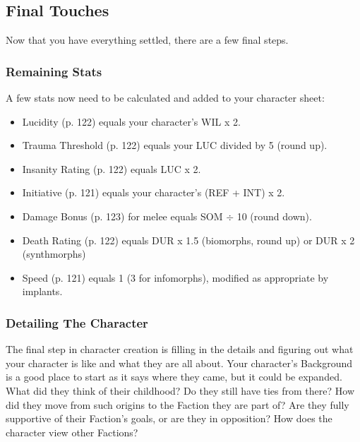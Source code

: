 \subsection{Final Touches}

Now that you have everything settled, there are a few final steps.

\subsubsection{Remaining Stats}
A few stats now need to be calculated and added to your character sheet:

\begin{itemize}
\item Lucidity (p. 122) equals your character’s WIL x 2.
\item Trauma Threshold (p. 122) equals your LUC divided by 5 (round up).
\item Insanity Rating (p. 122) equals LUC x 2.
\item Initiative (p. 121) equals your character’s (REF + INT) x 2.
\item Damage Bonus (p. 123) for melee equals SOM $\div$ 10 (round down).
\item Death Rating (p. 122) equals DUR x 1.5 (biomorphs, round up) or DUR x 2
  (synthmorphs)
\item Speed (p. 121) equals 1 (3 for infomorphs), modified as appropriate by
  implants.
\end{itemize}

\subsubsection{Detailing The Character}
The final step in character creation is filling in the details and figuring
out what your character is like and what they are all about. Your character’s
Background is a good place to start as it says where they came, but it could be
expanded. What did they think of their childhood? Do they still have ties from
there? How did they move from such origins to the Faction they are part of? Are
they fully supportive of their Faction’s goals, or are they in opposition? How
does the character view other Factions?

